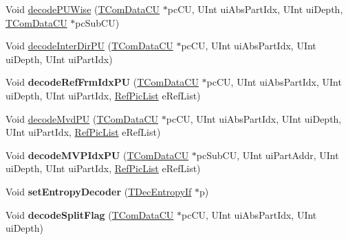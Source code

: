 \begin{DoxyCompactItemize}
\item 
Void \hyperlink{class_t_dec_entropy_ab802759fd95e6a721f591fbcc3131ea2}{decode\+P\+U\+Wise} (\hyperlink{class_t_com_data_c_u}{T\+Com\+Data\+CU} $\ast$pc\+CU, U\+Int ui\+Abs\+Part\+Idx, U\+Int ui\+Depth, \hyperlink{class_t_com_data_c_u}{T\+Com\+Data\+CU} $\ast$pc\+Sub\+CU)
\item 
Void \hyperlink{class_t_dec_entropy_a921b5de984e008dbaad5cad333a530e4}{decode\+Inter\+Dir\+PU} (\hyperlink{class_t_com_data_c_u}{T\+Com\+Data\+CU} $\ast$pc\+CU, U\+Int ui\+Abs\+Part\+Idx, U\+Int ui\+Depth, U\+Int ui\+Part\+Idx)
\item 
\mbox{\label{class_t_dec_entropy_a97149997ac5f8e6cdc0828b9c5371672}} 
Void {\bfseries decode\+Ref\+Frm\+Idx\+PU} (\hyperlink{class_t_com_data_c_u}{T\+Com\+Data\+CU} $\ast$pc\+CU, U\+Int ui\+Abs\+Part\+Idx, U\+Int ui\+Depth, U\+Int ui\+Part\+Idx, \hyperlink{_type_def_8h_a93cea48eb9dcfd661168dee82e41b384}{Ref\+Pic\+List} e\+Ref\+List)
\item 
Void \hyperlink{class_t_dec_entropy_a766b8985236f38c4f059d738680a2328}{decode\+Mvd\+PU} (\hyperlink{class_t_com_data_c_u}{T\+Com\+Data\+CU} $\ast$pc\+CU, U\+Int ui\+Abs\+Part\+Idx, U\+Int ui\+Depth, U\+Int ui\+Part\+Idx, \hyperlink{_type_def_8h_a93cea48eb9dcfd661168dee82e41b384}{Ref\+Pic\+List} e\+Ref\+List)
\item 
\mbox{\label{class_t_dec_entropy_a5526792e3a098ae01e5a41d997d3a77c}} 
Void {\bfseries decode\+M\+V\+P\+Idx\+PU} (\hyperlink{class_t_com_data_c_u}{T\+Com\+Data\+CU} $\ast$pc\+Sub\+CU, U\+Int ui\+Part\+Addr, U\+Int ui\+Depth, U\+Int ui\+Part\+Idx, \hyperlink{_type_def_8h_a93cea48eb9dcfd661168dee82e41b384}{Ref\+Pic\+List} e\+Ref\+List)
\item 
\mbox{\label{class_t_dec_entropy_ab39c8c895f9d29768150a20622ef8444}} 
Void {\bfseries set\+Entropy\+Decoder} (\hyperlink{class_t_dec_entropy_if}{T\+Dec\+Entropy\+If} $\ast$p)
\item 
\mbox{\label{class_t_dec_entropy_af710d117bc49447325cf647e9cd0121c}} 
Void {\bfseries decode\+Split\+Flag} (\hyperlink{class_t_com_data_c_u}{T\+Com\+Data\+CU} $\ast$pc\+CU, U\+Int ui\+Abs\+Part\+Idx, U\+Int ui\+Depth)
\item 
\mbox{\label{class_t_dec_entropy_ad3f61a8ab08e253a80f0023f0358e7db}} 

\end{DoxyCompactItemize}

